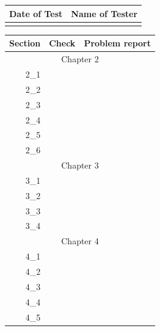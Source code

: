 
\begin{tabular}{|p{3cm}|p{8cm}|}
\hline
Date of Test & Name of Tester \\
\hline
\hline
 &  \\
\hline
\hline
\end{tabular}



\begin{tabular}{|r|r|p{8cm}|}
\hline
Section & Check & Problem report \\
\hline
\hline
\multicolumn{3}{|c|}{Chapter 2}\\
\hline
2\_1 & & \\
\hline
2\_2 & & \\
\hline
2\_3 & & \\
\hline
2\_4 & & \\
\hline
2\_5 & & \\
\hline
2\_6 & & \\
\hline
\hline
\multicolumn{3}{|c|}{Chapter 3}\\
\hline
3\_1 & & \\
\hline
3\_2 & & \\
\hline
3\_3 & & \\
\hline
3\_4 & & \\
\hline
\hline
\multicolumn{3}{|c|}{Chapter 4}\\
\hline
4\_1 & & \\
\hline
4\_2 & & \\
\hline
4\_3 & & \\
\hline
4\_4 & & \\
\hline
4\_5 & & \\
\hline
\hline
\end{tabular}


